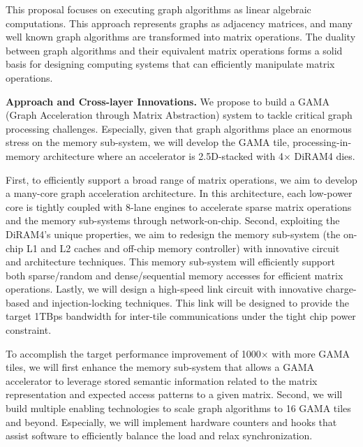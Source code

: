 \noindent
This proposal focuses on executing graph algorithms as linear algebraic computations. 
This approach represents graphs as adjacency matrices, and many well known graph algorithms are transformed into matrix operations. 
The %
duality between graph algorithms and their equivalent matrix operations forms a solid basis for designing computing systems that can efficiently manipulate matrix operations. 

\vspace{3pt}
\noindent
\textbf{Approach and Cross-layer Innovations.} 
We propose to build a GAMA (Graph Acceleration through Matrix Abstraction) system to tackle critical graph processing challenges. 
Especially, given that graph algorithms place an enormous stress on the memory sub-system, 
we will develop the GAMA tile, processing-in-memory architecture where an accelerator is 2.5D-stacked with 
4$\times$
DiRAM4 dies.

First, to efficiently support a broad range of matrix operations, we aim to develop a many-core graph acceleration architecture. 
In this architecture, each low-power core is tightly coupled with 8-lane engines to accelerate sparse matrix operations and the memory sub-systems through network-on-chip.
Second, exploiting the DiRAM4's unique properties, we aim to redesign the memory sub-system (the on-chip L1 and L2 caches and off-chip memory controller) with innovative circuit and architecture techniques. 
This memory sub-system will efficiently support both sparse/random and dense/sequential memory accesses for efficient matrix operations. 
Lastly, we will design a high-speed link circuit with innovative charge-based and injection-locking techniques. 
This link will 
be designed to provide the target 1TBps bandwidth for inter-tile communications under the tight chip power constraint.


To accomplish the target performance improvement of 1000$\times$ with more GAMA tiles, %
we will first enhance the memory sub-system that allows a GAMA accelerator to leverage 
stored semantic information related to the matrix representation and expected access patterns to a given matrix.   
Second, we will build multiple enabling technologies to scale graph algorithms to 16 GAMA tiles and beyond. 
Especially, we will implement hardware counters and hooks that assist software to efficiently balance the load and relax synchronization.


